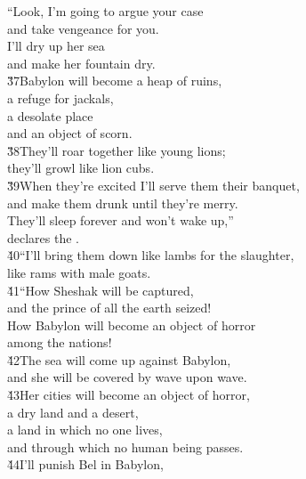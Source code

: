 \begin{poetry}
\poeml ``Look, I'm going to argue your case \\
\poemll    and take vengeance for you. \\
\poeml I'll dry up her sea \\
\poemll    and make her fountain dry. \\
\poeml \v{37}Babylon will become a heap of ruins, \\
\poemll    a refuge for jackals, \\
\poeml a desolate place \\
\poemll    and an object of scorn. \\
\poeml \v{38}They'll roar together like young lions; \\
\poemll    they'll growl like lion cubs. \\
\poeml \v{39}When they're excited I'll serve them their banquet, \\
\poemll    and make them drunk until they're merry. \\
\poeml They'll sleep forever and won't wake up,'' \\
\poemll    declares the . \\
\poeml \v{40}``I'll bring them down like lambs for the slaughter, \\
\poemll    like rams with male goats. \\
\poeml \v{41}``How Sheshak will be captured, \\
\poemll    and the prince of all the earth seized! \\
\poeml How Babylon will become an object of horror \\
\poemll    among the nations! \\
\poeml \v{42}The sea will come up against Babylon, \\
\poemll    and she will be covered by wave upon wave. \\
\poeml \v{43}Her cities will become an object of horror, \\
\poemll    a dry land and a desert, \\
\poeml a land in which no one lives, \\
\poemll    and through which no human being passes. \\
\poeml \v{44}I'll punish Bel in Babylon, \\

\end{poetry}
